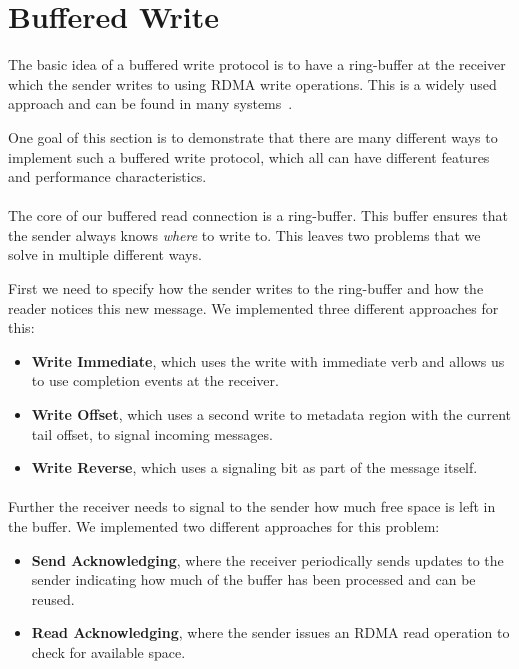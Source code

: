 \section{Buffered Write} \label{sec:conn:buf_write}

The basic idea of a buffered write protocol is to have a ring-buffer at the receiver which the sender writes to using
RDMA write operations. This is a widely used approach and can be found in many systems~\cite{herd, scal-rdma-rpc}.

One goal of this section is to demonstrate that there are many different ways to implement such a buffered write 
protocol, which all can have different features and performance characteristics.


\paragraph{}The core of our buffered read connection is a ring-buffer. This buffer ensures that the sender always knows 
\emph{where} to  write to. This leaves two problems that we solve in multiple different ways.

First we need to specify how the sender writes to the ring-buffer and how the reader notices this new message. We 
implemented three different approaches for this: 
\begin{itemize}
  \item \textbf{Write Immediate}, which uses the write with immediate verb and allows us to use completion 
    events at the receiver.
  \item \textbf{Write Offset}, which uses a second write to metadata region with the current tail offset,
    to signal incoming messages.
  \item \textbf{Write Reverse}, which uses a signaling bit as part of the message itself.
\end{itemize}
 

\paragraph{} Further the receiver needs to signal to the sender how much free space is left in the buffer. We implemented 
two different approaches for this problem:

\begin{itemize}
  \item \textbf{Send Acknowledging}, where the receiver periodically sends updates to the sender indicating how much of
    the buffer has been processed and can be reused.
  \item \textbf{Read Acknowledging}, where the sender issues an RDMA read operation to check for available space.
\end{itemize}

